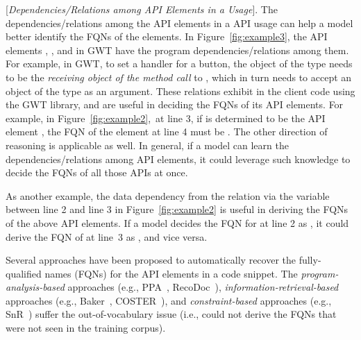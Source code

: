 \vspace{2pt}
 [{\em Dependencies/Relations among API
    Elements in a Usage}]. The dependencies/relations among the API
elements in a API usage can help a model better identify the FQNs of
the elements.  In Figure~\ref{fig:example3}, the API elements
, , and  in GWT
have the program dependencies/relations among them. For example, in
GWT, to set a handler for a button, the object of the type
 needs to be the {\em receiving object of the method
  call} to , which in turn needs to accept an
object of the type  as an argument. These relations
exhibit in the client code using the GWT library, and are useful in
deciding the FQNs of its API elements. For example, in
Figure~\ref{fig:example2},~at line 3, if  is
determined to be the API element
, the
FQN of the element at line 4 must be
.  The
other direction of reasoning is applicable as well. In general, if a
model can learn the dependencies/relations among API elements, it
could leverage such knowledge to decide the FQNs of all those APIs at once.


As another example, the data dependency from the 
relation via the variable  between line 2 and line 3 in
Figure~\ref{fig:example2} is useful in deriving the FQNs of the
above API elements. If a model decides the FQN for  at
line 2 as , it
could derive the FQN of  at line~3 as
,
and vice versa.

\vspace{2pt}
 Several approaches have
been proposed to automatically recover the fully-qualified names
(FQNs) for the API elements in a code snippet. The {\em
  program-analysis-based} approaches (e.g.,
PPA~\cite{dagenais-oopsla08}, RecoDoc~\cite{dagenais-icse12}), {\em
  information-retrieval-based} approaches (e.g.,
Baker~\cite{liveapi14}, COSTER~\cite{coster-ase19}), and {\em
  constraint-based} approaches (e.g., SnR~\cite{snr-icse22}) suffer
the out-of-vocabulary issue (i.e., could not derive the FQNs that were
not seen in the training corpus).

